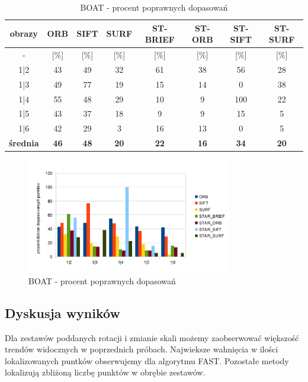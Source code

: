 \begin{table}[htbp]
  \centering
  \caption{BOAT - procent poprawnych dopasowań}
    \begin{tabular}{|c|c|c|c|c|c|c|c|}\hline
    obrazy & \textbf{ORB} & \textbf{SIFT} & \textbf{SURF} & \textbf{ST-BRIEF} & \textbf{ST-ORB} & \textbf{ST-SIFT} & \textbf{ST-SURF} \\\hline
     - & [\%] & [\%] & [\%] & [\%] & [\%] & [\%] & [\%] \\\hline
   
    1|2 & 43 & 49 & 32 & 61 & 38 & 56 & 28 \\
    1|3 & 49 & 77 & 19 & 15 & 14 & 0 & 38 \\
    1|4 & 55 & 48 & 29 & 10 & 9 & 100 & 22 \\
    1|5 & 43 & 37 & 18 & 9 & 9 & 15 & 5 \\
    1|6 & 42 & 29 & 3 & 16 & 13 & 0 & 5 \\\hline
    \textbf{średnia} & \textbf{46} & \textbf{48} & \textbf{20} & \textbf{22} & \textbf{16} & \textbf{34} & \textbf{20} \\\hline
     \end{tabular}%
  \label{tab:boat_m2}%
\end{table}%


\begin{figure}
\centering
\includegraphics[width=0.8\textwidth]{pict/mikolajczyk/boat/m2.png}
\caption{BOAT - procent poprawnych dopasowań}
\label{fig:boat_m2}
\end{figure}
\FloatBarrier
\subsection{Dyskusja wyników}
Dla zestawów poddanych rotacji i zmianie skali możemy zaobserwować większość trendów widocznych w poprzednich próbach. Najwieksze wahnięcia w ilości lokalizowanych puntków obserwujemy dla algorytmu FAST. Pozostałe metody lokalizują zbliżoną liczbę punktów w obrębie zestawów.

